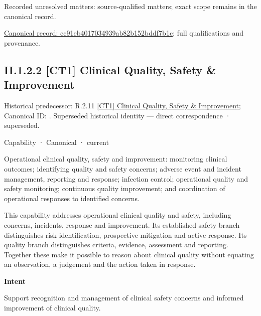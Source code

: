 {\small Recorded unresolved matters: source-qualified matters; exact scope remains in the canonical record.}\par
{\footnotesize \href{../../../../continuum/strategy/capability/cc91eb4017034939ab82b152bddf7b1c.md}{Canonical record: cc91eb4017034939ab82b152bddf7b1c}; full qualifications and provenance.}\par
\subsection*{II.1.2.2 [CT1] Clinical Quality, Safety \& Improvement}
\label{navigation:II.1.2.2}

{\small Historical predecessor: R.2.11 \hyperref[element:b967c383dbcd4c24abe6a83ea5e79e00]{[CT1] Clinical Quality, Safety \& Improvement}; Canonical ID: \texttt{}. Superseded historical identity — direct correspondence · superseded.}\par
\label{element:63837bf848774572a06b935af95581a2}
{\small Capability · Canonical · current}\par

Operational clinical quality, safety and improvement: monitoring clinical outcomes; identifying quality and safety concerns; adverse event and incident management, reporting and response; infection control; operational quality and safety monitoring; continuous quality improvement; and coordination of operational responses to identified concerns.



This capability addresses operational clinical quality and safety, including concerns, incidents, response and improvement. Its established safety branch distinguishes risk identification, prospective mitigation and active response. Its quality branch distinguishes criteria, evidence, assessment and reporting. Together these make it possible to reason about clinical quality without equating an observation, a judgement and the action taken in response.



\textbf{Intent}



Support recognition and management of clinical safety concerns and informed improvement of clinical quality.



